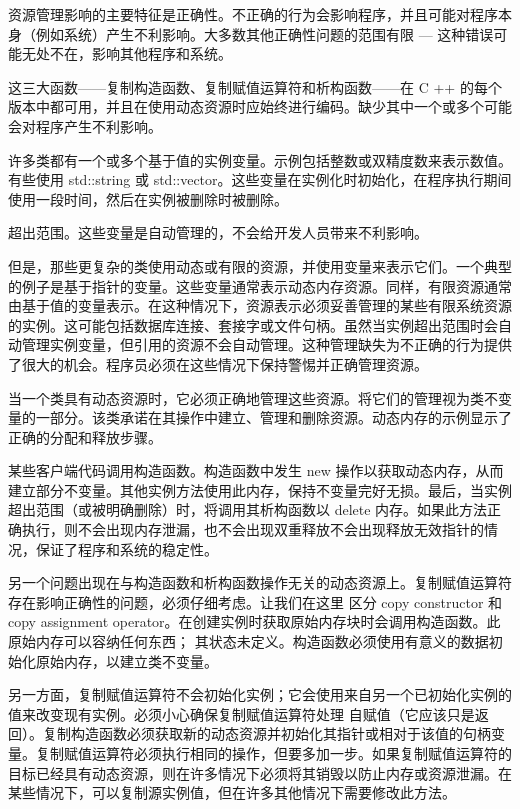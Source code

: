 资源管理影响的主要特征是正确性。不正确的行为会影响程序，并且可能对程序本身（例如系统）产生不利影响。大多数其他正确性问题的范围有限 — 这种错误可能无处不在，影响其他程序和系统。

这三大函数——复制构造函数、复制赋值运算符和析构函数——在 C ++ 的每个版本中都可用，并且在使用动态资源时应始终进行编码。缺少其中一个或多个可能会对程序产生不利影响。

许多类都有一个或多个基于值的实例变量。示例包括整数或双精度数来表示数值。有些使用 std::string 或 std::vector。这些变量在实例化时初始化，在程序执行期间使用一段时间，然后在实例被删除时被删除。

超出范围。这些变量是自动管理的，不会给开发人员带来不利影响。

但是，那些更复杂的类使用动态或有限的资源，并使用变量来表示它们。一个典型的例子是基于指针的变量。这些变量通常表示动态内存资源。同样，有限资源通常由基于值的变量表示。在这种情况下，资源表示必须妥善管理的某些有限系统资源的实例。这可能包括数据库连接、套接字或文件句柄。虽然当实例超出范围时会自动管理实例变量，但引用的资源不会自动管理。这种管理缺失为不正确的行为提供了很大的机会。程序员必须在这些情况下保持警惕并正确管理资源。


当一个类具有动态资源时，它必须正确地管理这些资源。将它们的管理视为类不变量的一部分。该类承诺在其操作中建立、管理和删除资源。动态内存的示例显示了正确的分配和释放步骤。

某些客户端代码调用构造函数。构造函数中发生 new 操作以获取动态内存，从而建立部分不变量。其他实例方法使用此内存，保持不变量完好无损。最后，当实例超出范围（或被明确删除）时，将调用其析构函数以 delete 内存。如果此方法正确执行，则不会出现内存泄漏，也不会出现双重释放不会出现释放无效指针的情况，保证了程序和系统的稳定性。

另一个问题出现在与构造函数和析构函数操作无关的动态资源上。复制赋值运算符存在影响正确性的问题，必须仔细考虑。让我们在这里 区分 copy constructor 和 copy assignment operator。在创建实例时获取原始内存块时会调用构造函数。此原始内存可以容纳任何东西； 其状态未定义。构造函数必须使用有意义的数据初始化原始内存，以建立类不变量。

另一方面，复制赋值运算符不会初始化实例；它会使用来自另一个已初始化实例的值来改变现有实例。必须小心确保复制赋值运算符处理 自赋值（它应该只是返回）。复制构造函数必须获取新的动态资源并初始化其指针或相对于该值的句柄变量。复制赋值运算符必须执行相同的操作，但要多加一步。如果复制赋值运算符的目标已经具有动态资源，则在许多情况下必须将其销毁以防止内存或资源泄漏。在某些情况下，可以复制源实例值，但在许多其他情况下需要修改此方法。

